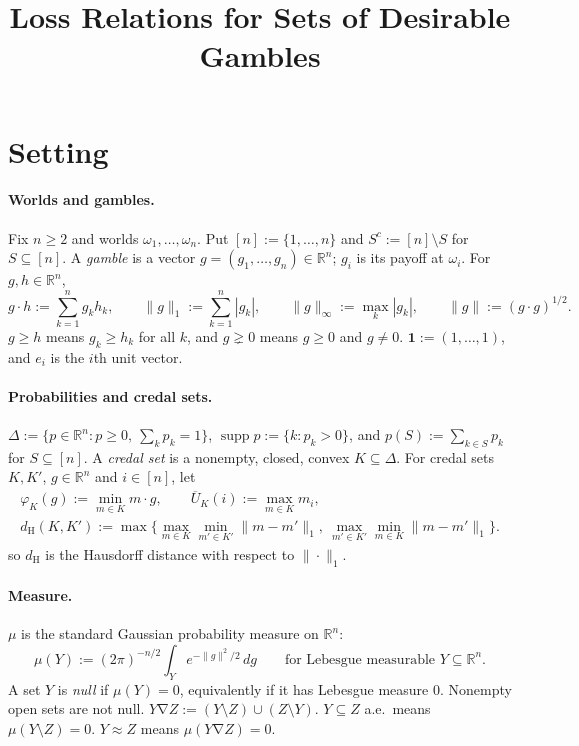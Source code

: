 \documentclass[11pt]{article}
\title{Loss Relations for Sets of Desirable Gambles}
\author{}
\date{}
\theoremstyle{definition}
\newcommand{\R}{\mathbb R}
\newcommand{\one}{\mathbf 1}
\newcommand{\supp}{\operatorname{supp}}
\newcommand{\dH}{d_{\mathrm H}}
\newcommand{\Ub}{\overline U}
\newcommand{\sd}{\mathbin{\nabla}}
\begin{document}
\maketitle

\section{Setting}\label{sec:setting}

\paragraph{Worlds and gambles.}
Fix $n\ge 2$ and worlds $\omega_1,\dots,\omega_n$. Put $[n]:=\{1,\dots,n\}$ and $S^c:=[n]\setminus S$ for $S\subseteq[n]$. A \emph{gamble} is a vector $g=(g_1,\dots,g_n)\in\R^n$; $g_i$ is its payoff at $\omega_i$. For $g,h\in\R^n$,
\[
g\cdot h:=\sum_{k=1}^n g_kh_k,\qquad \|g\|_1:=\sum_{k=1}^n|g_k|,\qquad \|g\|_\infty:=\max_{k}|g_k|,\qquad \|g\|:=(g\cdot g)^{1/2}.
\]
$g\ge h$ means $g_k\ge h_k$ for all $k$, and $g\gneq 0$ means $g\ge 0$ and $g\neq 0$. $\one:=(1,\dots,1)$, and $e_i$ is the $i$th unit vector.

\paragraph{Probabilities and credal sets.}
$\Delta:=\{p\in\R^n:p\ge 0,\ \sum_kp_k=1\}$, $\supp p:=\{k:p_k>0\}$, and $p(S):=\sum_{k\in S}p_k$ for $S\subseteq[n]$. A \emph{credal set} is a nonempty, closed, convex $K\subseteq\Delta$. For credal sets $K,K'$, $g\in\R^n$ and $i\in[n]$, let
\begin{gather*}
\varphi_K(g):=\min_{m\in K}m\cdot g,\qquad \Ub_K(i):=\max_{m\in K}m_i,\\
\dH(K,K'):=\max\Big\{\max_{m\in K}\min_{m'\in K'}\|m-m'\|_1,\ \max_{m'\in K'}\min_{m\in K}\|m-m'\|_1\Big\}.
\end{gather*}
so $\dH$ is the Hausdorff distance with respect to $\|\cdot\|_1$.

\paragraph{Measure.}
$\mu$ is the standard Gaussian probability measure on $\R^n$:
\[
\mu(Y):=(2\pi)^{-n/2}\int_Ye^{-\|g\|^2/2}\,dg\qquad\text{for Lebesgue measurable }Y\subseteq\R^n.
\]
A set $Y$ is \emph{null} if $\mu(Y)=0$, equivalently if it has Lebesgue measure $0$. Nonempty open sets are not null. $Y\sd Z:=(Y\setminus Z)\cup(Z\setminus Y)$. $Y\subseteq Z$ a.e.\ means $\mu(Y\setminus Z)=0$. $Y\approx Z$ means $\mu(Y\sd Z)=0$.
\end{document}
